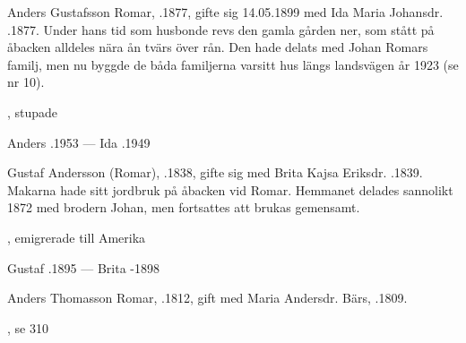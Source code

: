 Anders Gustafsson Romar, .1877, gifte sig 14.05.1899 med Ida Maria Johansdr. .1877. Under hans tid som husbonde revs den gamla gården ner, som stått på åbacken alldeles nära ån tvärs över rån. Den hade delats med Johan Romars familj, men nu byggde de båda familjerna varsitt hus längs landsvägen år 1923 (se nr 10).
\begin{jhchildren}
  \item {}
  \item {}
  \item {}
  \item {}, stupade
  \item {}
  \item {}
\end{jhchildren}

Anders .1953  ---  Ida .1949






Gustaf Andersson (Romar), .1838, gifte sig med Brita Kajsa Eriksdr. .1839. Makarna hade sitt jordbruk på åbacken vid Romar. Hemmanet delades sannolikt 1872 med brodern Johan, men fortsattes att brukas gemensamt.
\begin{jhchildren}
  \item {}, emigrerade till Amerika
  \item {}
  \item {}
\end{jhchildren}

Gustaf .1895  ---  Brita -1898


Anders  Thomasson Romar, .1812, gift med Maria Andersdr. Bärs, .1809.
\begin{jhchildren}
  \item {}, se 310
  \item {}
  \item {}
  \item {}
  \item {}
  \item {}
  \item {}
\end{jhchildren}

